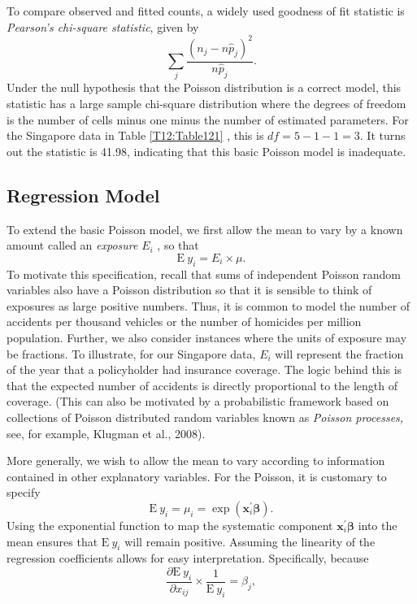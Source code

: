 
To compare observed and fitted counts, a widely used goodness of fit
statistic is \emph{Pearson's chi-square statistic}, given by
\begin{equation}\label{E12:Pearson}
\sum_j\frac{\left( n_j-n\widehat{p}_j\right)^2}{n\widehat{p}_j}.
\end{equation}
Under the null hypothesis that the Poisson distribution is a correct
model, this statistic has a large sample chi-square distribution
where the degrees of freedom is the number of cells minus one minus
the number of estimated parameters. For the Singapore data in Table
\ref{T12:Table121} , this is $df=5-1-1=3$. It turns out the
statistic is 41.98, indicating that this basic Poisson model is
inadequate.

\subsection{Regression Model}


To extend the basic Poisson model, we first allow the mean to vary
by a known amount called an \emph{exposure} $E_i$ , so that
\begin{equation*}
\mathrm{E~}y_i=E_i\times \mu .
\end{equation*}
To motivate this specification, recall that sums of independent
Poisson random variables also have a Poisson distribution so that it
is sensible to think of exposures as large positive numbers. Thus,
it is common to model the number of accidents per thousand vehicles
or the number of homicides per million population. Further, we also
consider instances where the units of exposure may be fractions. To
illustrate, for our Singapore data, $E_i$ will represent the
fraction of the year that a policyholder had insurance coverage. The
logic behind this is that the expected number of accidents is
directly proportional to the length of coverage. (This can also be
motivated by a probabilistic framework based on collections of
Poisson distributed random variables known as \emph{Poisson
processes,} see, for example, Klugman et al., 2008).

More generally, we wish to allow the mean to vary according to
information contained in other explanatory variables. For the
Poisson, it is customary to specify
\begin{equation*}
\mathrm{E~}y_i = \mu_i = \exp \left(
\mathbf{x}_i^{\prime}\boldsymbol \beta \right) .
\end{equation*}
Using the exponential function to map the systematic component
$\mathbf{x}_i^{\prime }\boldsymbol \beta$ into the mean ensures that
$\mathrm{E~}y_i$ will remain positive. Assuming the linearity of the
regression coefficients allows for easy interpretation.
Specifically, because
\begin{equation*}
\frac{\partial \mathrm{E~}y_i}{\partial x_{ij}} \times
\frac{1}{\mathrm{E~}y_i} =\beta_j,
\end{equation*}

